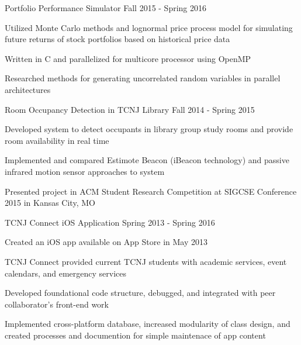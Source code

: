 

\begin{cventries}

  \bproject
    {Portfolio Performance Simulator} %
    {Fall 2015 - Spring 2016} %
    {
      \begin{cvitems} %
        \item {Utilized Monte Carlo methods and lognormal price process model for simulating future returns of stock portfolios based on historical price data}
        \item {Written in C and parallelized for multicore processor using OpenMP}
        \item {Researched methods for generating uncorrelated random variables in parallel architectures}
      \end{cvitems}
    }

  \bproject
    {Room Occupancy Detection in TCNJ Library} %
    {Fall 2014 - Spring 2015} %
    {
      \begin{cvitems} %
        \item {Developed system to detect occupants in library group study rooms and provide room availability in real time}
        \item {Implemented and compared Estimote Beacon (iBeacon technology) and passive infrared motion sensor approaches to system}
        \item {Presented project in ACM Student Research Competition at SIGCSE Conference 2015 in Kansas City, MO}
      \end{cvitems}
    }

  \bproject
    {TCNJ Connect iOS Application} %
    {Spring 2013 - Spring 2016} %
    {
      \begin{cvitems} %
        \item {Created an iOS app available on App Store in May 2013}
        \item {TCNJ Connect provided current TCNJ students with academic services, event calendars, and emergency services}
        \item {Developed foundational code structure, debugged, and integrated with peer collaborator's front-end work}
        \item {Implemented cross-platform database, increased modularity of class design, and created processes and documention for simple maintenace of app content}
      \end{cvitems}
    }

\end{cventries}
